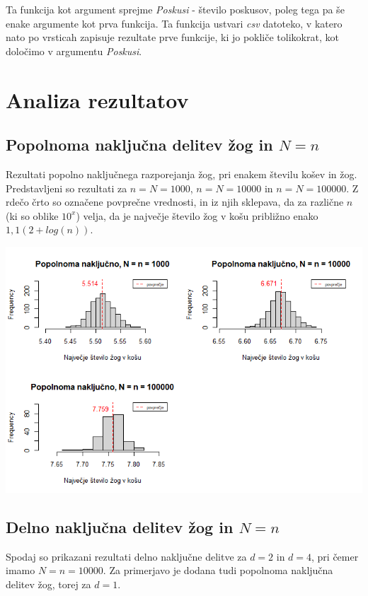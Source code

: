 \documentclass[a4paper, 11pt]{article}
\begin{document}
Ta funkcija kot argument sprejme \emph{Poskusi} - število poskusov, poleg tega pa še enake argumente kot prva funkcija. 
Ta funkcija ustvari \emph{csv} datoteko, v katero nato po vrsticah
zapisuje rezultate prve funkcije, ki jo pokliče tolikokrat,
kot določimo v argumentu \emph{Poskusi}. 

\pagebreak


\section{Analiza rezultatov}

\subsection{Popolnoma naključna delitev žog in $N = n$}
Rezultati popolno naključnega razporejanja žog, pri enakem številu košev in žog.
Predstavljeni so rezultati za $n = N = 1000$, $n = N = 10000$ in $n = N = 100000$.
Z rdečo črto so označene povprečne vrednosti, in iz njih sklepava, da za različne $n$ (ki so 
oblike $10^x$) velja,
da je največje število žog v košu približno enako $1,1(2+log(n))$.

\includegraphics[scale=0.6]{popolnoma_nakljucno.png}

\subsection{Delno naključna delitev žog in $N = n$}

Spodaj so prikazani rezultati delno naključne delitve za $d=2$ in $d=4$, pri čemer imamo
$N = n = 10000$. Za primerjavo je dodana tudi popolnoma naključna delitev žog, torej za $d = 1$.
\end{document}
